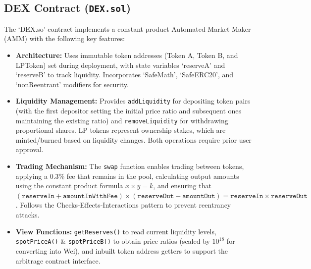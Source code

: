 \documentclass[12pt]{article}
\begin{document}
\subsection{DEX Contract (\texttt{DEX.sol})}
The `DEX.so' contract implements a constant product Automated Market Maker (AMM) with the following key features:
\begin{itemize}
    \item \textbf{Architecture:} Uses immutable token addresses (Token A, Token B, and LPToken) set during deployment, with state variables `reserveA' and `reserveB' to track liquidity. Incorporates `SafeMath', `SafeERC20', and `nonReentrant' modifiers for security.

    \item \textbf{Liquidity Management:} Provides \texttt{addLiquidity} for depositing token pairs (with the first depositor setting the initial price ratio and subsequent ones maintaining the existing ratio) and \texttt{removeLiquidity} for withdrawing proportional shares. LP tokens represent ownership stakes, which are minted/burned based on liquidity changes. Both operations require prior user approval.

    \item \textbf{Trading Mechanism:} The \texttt{swap} function enables trading between tokens, applying a 0.3\% fee that remains in the pool, calculating output amounts using the constant product formula $x \times y = k$, and ensuring that $(\texttt{reserveIn} + \texttt{amountInWithFee}) \times (\texttt{reserveOut} - \texttt{amountOut}) = \texttt{reserveIn} \times \texttt{reserveOut}$. Follows the Checks-Effects-Interactions pattern to prevent reentrancy attacks.

    \item \textbf{View Functions:} \texttt{getReserves()} to read current liquidity levels, \texttt{spotPriceA()} \& \texttt{spotPriceB()} to obtain price ratios (scaled by \(10^{18}\) for converting into Wei), and inbuilt token address getters to support the arbitrage contract interface.
\end{itemize}
\end{document}
